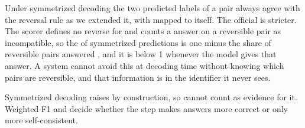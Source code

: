 Under symmetrized decoding the two predicted labels of a pair always agree with the reversal rule as we extended it, with \NO{} mapped to itself. The official \SoftCons{} is stricter. The scorer defines no reverse for \NO{} and counts a \NO{} answer on a reversible pair as incompatible, so the \SoftCons{} of symmetrized predictions is one minus the share of reversible pairs answered \NO{}, and it is below 1 whenever the model gives that answer. A system cannot avoid this at decoding time without knowing which pairs are reversible, and that information is in the identifier it never sees.

Symmetrized decoding raises \SoftCons{} by construction, so \SoftCons{} cannot count as evidence for it. Weighted F1 and \HardCons{} decide whether the step makes answers more correct or only more self-consistent.
